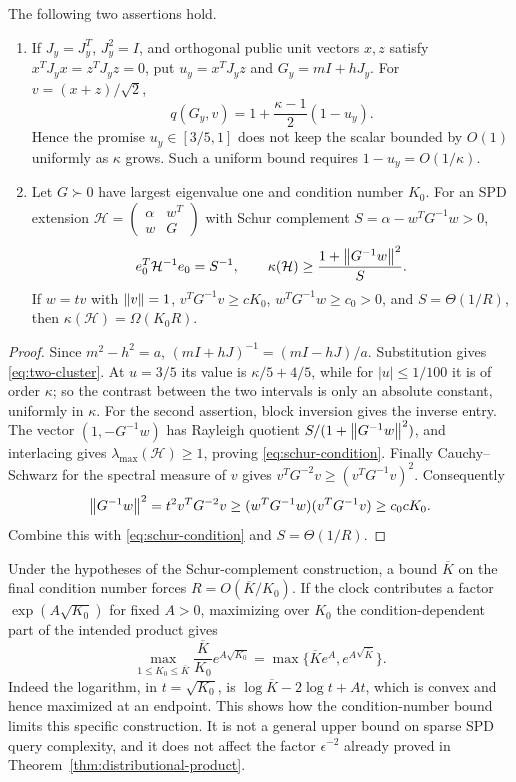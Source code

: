 \begin{proposition}\label{prop:contrast-obstructions}
The following two assertions hold.
\begin{enumerate}
\item If $J_y=J_y^T$, $J_y^2=I$, and orthogonal public unit vectors
$x,z$ satisfy $x^TJ_yx=z^TJ_yz=0$, put $u_y=x^TJ_yz$ and
$G_y=mI+hJ_y$. For $v=(x+z)/\sqrt2$,
\begin{equation}\label{eq:two-cluster}
 q(G_y,v)=1+\frac{\kappa-1}{2}(1-u_y).
\end{equation}
Hence the promise $u_y\in[3/5,1]$ does not keep the scalar bounded by
$O(1)$ uniformly as $\kappa$ grows. Such a uniform bound requires
$1-u_y=O(1/\kappa)$.
\item Let $G\succ0$ have largest eigenvalue one and condition number $K_0$.
For an SPD extension
$\mathcal H=\left(\begin{smallmatrix}\alpha&w^T\\w&G\end{smallmatrix}\right)$
with Schur complement $S=\alpha-w^TG^{-1}w>0$,
\begin{equation}\label{eq:schur-condition}
 e_0^T\mathcal H^{-1}e_0=S^{-1},\qquad
 \kappa(\mathcal H)\geq\frac{1+\left\lVert G^{-1}w\right\rVert^2}{S}.
\end{equation}
If $w=tv$ with $\left\lVert v\right\rVert=1$, $v^TG^{-1}v\geq cK_0$,
$w^TG^{-1}w\geq c_0>0$, and $S=\Theta(1/R)$, then
$\kappa(\mathcal H)=\Omega(K_0R)$.
\end{enumerate}
\end{proposition}
\begin{proof}
Since $m^2-h^2=a$, $(mI+hJ)^{-1}=(mI-hJ)/a$.
Substitution gives \eqref{eq:two-cluster}. At $u=3/5$ its value is
$\kappa/5+4/5$, while for $|u|\leq1/100$ it is of order $\kappa$;
so the contrast between the two intervals is only an absolute
constant, uniformly in $\kappa$.
For the second assertion, block inversion gives the inverse entry.
The vector $(1,-G^{-1}w)$ has Rayleigh quotient
$S/(1+\left\lVert G^{-1}w\right\rVert^2)$, and interlacing gives
$\lambda_{\max}(\mathcal H)\geq1$, proving
\eqref{eq:schur-condition}. Finally Cauchy--Schwarz for the spectral
measure of $v$ gives $v^TG^{-2}v\geq(v^TG^{-1}v)^2$. Consequently
\[
 \left\lVert G^{-1}w\right\rVert^2=t^2v^TG^{-2}v
 \geq(w^TG^{-1}w)(v^TG^{-1}v)\geq c_0cK_0.
\]
Combine this with \eqref{eq:schur-condition} and $S=\Theta(1/R)$.
\end{proof}

Under the hypotheses of the Schur-complement construction, a bound
$\overline K$ on the final condition number forces
$R=O(\overline K/K_0)$. If the clock contributes a factor
$\exp(A\sqrt{K_0})$ for fixed $A>0$, maximizing over $K_0$ the
condition-dependent part of the intended product gives
\[
 \max_{1\leq K_0\leq\overline K}
 \frac{\overline K}{K_0}e^{A\sqrt{K_0}}
 =\max\{\overline K e^A,e^{A\sqrt{\overline K}}\}.
\]
Indeed the logarithm, in $t=\sqrt{K_0}$, is
$\log\overline K-2\log t+At$, which is convex and hence maximized
at an endpoint. This shows how the condition-number bound limits
this specific construction. It is not a general
upper bound on sparse SPD query complexity, and it does not affect the
factor $\epsilon^{-2}$ already proved in
Theorem~\ref{thm:distributional-product}.


